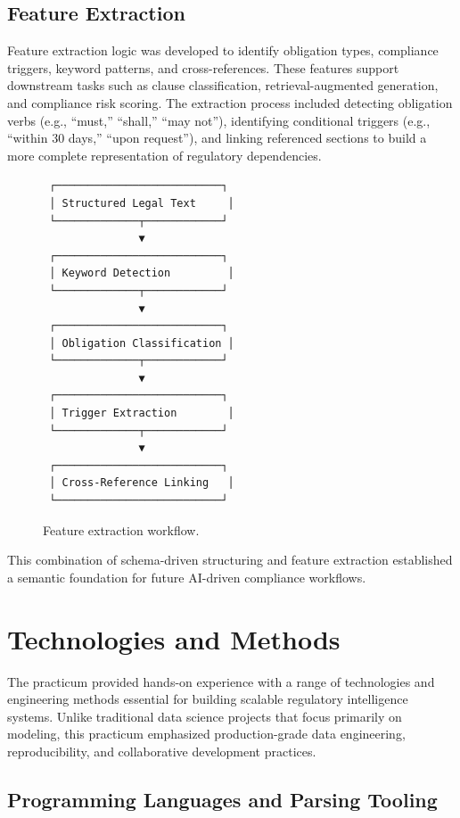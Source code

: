 \documentclass[sigconf]{acmart}
\begin{document}
\subsection{Feature Extraction}
Feature extraction logic was developed to identify obligation types, compliance triggers, keyword patterns, and cross-references. These features support downstream tasks such as clause classification, retrieval-augmented generation, and compliance risk scoring. The extraction process included detecting obligation verbs (e.g., “must,” “shall,” “may not”), identifying conditional triggers (e.g., “within 30 days,” “upon request”), and linking referenced sections to build a more complete representation of regulatory dependencies.


\begin{figure}[h]
\centering
\begin{verbatim}
 ┌──────────────────────────┐
 │ Structured Legal Text     │
 └─────────────┬────────────┘
               ▼
 ┌──────────────────────────┐
 │ Keyword Detection         │
 └─────────────┬────────────┘
               ▼
 ┌──────────────────────────┐
 │ Obligation Classification │
 └─────────────┬────────────┘
               ▼
 ┌──────────────────────────┐
 │ Trigger Extraction        │
 └─────────────┬────────────┘
               ▼
 ┌──────────────────────────┐
 │ Cross-Reference Linking   │
 └──────────────────────────┘
\end{verbatim}
\caption{Feature extraction workflow.}
\end{figure}


This combination of schema-driven structuring and feature extraction established a semantic foundation for future AI-driven compliance workflows.

\section{Technologies and Methods}

The practicum provided hands-on experience with a range of technologies and engineering methods essential for building scalable regulatory intelligence systems. Unlike traditional data science projects that focus primarily on modeling, this practicum emphasized production-grade data engineering, reproducibility, and collaborative development practices.

\subsection{Programming Languages and Parsing Tooling}
\end{document}
